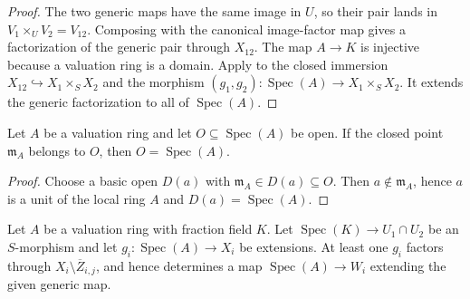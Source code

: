 \begin{proof}
  \leanok
  The two generic maps have the same image in $U$, so their pair lands in
  $V_1\times_UV_2=V_{12}$.  Composing with the canonical image-factor map
  gives a factorization of the generic pair through $X_{12}$.  The map
  $A\to K$ is injective because a valuation ring is a domain.  Apply
   to the closed immersion
  $X_{12}\hookrightarrow X_1\times_SX_2$ and the morphism
  $(g_1,g_2)\colon\operatorname{Spec}(A)\to X_1\times_SX_2$.  It extends the
  generic factorization to all of $\operatorname{Spec}(A)$.
\end{proof}

\begin{lemma}
  \label{lemma:nagata-valuation-open-closed-point}
  \leanok

  Let $A$ be a valuation ring and let $O\subseteq\operatorname{Spec}(A)$ be
  open.  If the closed point $\mathfrak m_A$ belongs to $O$, then
  $O=\operatorname{Spec}(A)$.
\end{lemma}

\begin{proof}
  \leanok
  Choose a basic open $D(a)$ with $\mathfrak m_A\in D(a)\subseteq O$.
  Then $a\notin\mathfrak m_A$, hence $a$ is a unit of the local ring $A$ and
  $D(a)=\operatorname{Spec}(A)$.
\end{proof}

\begin{lemma}
  \label{lemma:nagata-one-valuation-avoids-boundary}
  \leanok

  Let $A$ be a valuation ring with fraction field $K$.  Let
  $\operatorname{Spec}(K)\to U_1\cap U_2$ be an $S$-morphism and let
  $g_i\colon\operatorname{Spec}(A)\to X_i$ be extensions.  At least one
  $g_i$ factors through $X_i\setminus\overline Z_{i,j}$, and hence determines
  a map $\operatorname{Spec}(A)\to W_i$ extending the given generic map.
\end{lemma}

